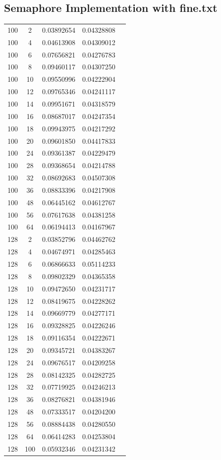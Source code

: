 \documentclass[letterpaper,12pt]{article}
\theoremstyle{remark}
\begin{document}
\subsection*{Semaphore Implementation  with fine.txt}
\begin{tabular}{ccccc}
100 & 2 & 0.03892654 & 0.04328808 \\
100 & 4 & 0.04613908 & 0.04309012 \\
100 & 6 & 0.07656821 & 0.04276783 \\
100 & 8 & 0.09460117 & 0.04307250 \\
100 & 10 & 0.09550996 & 0.04222904 \\
100 & 12 & 0.09765346 & 0.04241117 \\
100 & 14 & 0.09951671 & 0.04318579 \\
100 & 16 & 0.08687017 & 0.04247354 \\
100 & 18 & 0.09943975 & 0.04217292 \\
100 & 20 & 0.09601850 & 0.04417833 \\
100 & 24 & 0.09361387 & 0.04229479 \\
100 & 28 & 0.09368654 & 0.04214788 \\
100 & 32 & 0.08692683 & 0.04507308 \\
100 & 36 & 0.08833396 & 0.04217908 \\
100 & 48 & 0.06445162 & 0.04612767 \\
100 & 56 & 0.07617638 & 0.04381258 \\
100 & 64 & 0.06194413 & 0.04167967 \\
128 & 2 & 0.03852796 & 0.04462762 \\
128 & 4 & 0.04674971 & 0.04285463 \\
128 & 6 & 0.06866633 & 0.05114233 \\
128 & 8 & 0.09802329 & 0.04365358 \\
128 & 10 & 0.09472650 & 0.04231717 \\
128 & 12 & 0.08419675 & 0.04228262 \\
128 & 14 & 0.09669779 & 0.04277171 \\
128 & 16 & 0.09328825 & 0.04226246 \\
128 & 18 & 0.09116354 & 0.04222671 \\
128 & 20 & 0.09345721 & 0.04383267 \\
128 & 24 & 0.09676517 & 0.04209258 \\
128 & 28 & 0.08142325 & 0.04282725 \\
128 & 32 & 0.07719925 & 0.04246213 \\
128 & 36 & 0.08276821 & 0.04381946 \\
128 & 48 & 0.07333517 & 0.04204200 \\
128 & 56 & 0.08884438 & 0.04280550 \\
128 & 64 & 0.06414283 & 0.04253804 \\
128 & 100 & 0.05932346 & 0.04231342 \\
\end{tabular}
\end{document}
